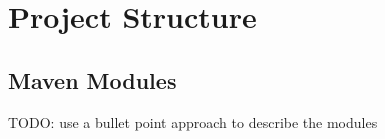 \chapter{Project Structure}\label{ch:project_structure}

\section{Maven Modules}\label{sec:maven_modules}

TODO: use a bullet point approach to describe the modules

